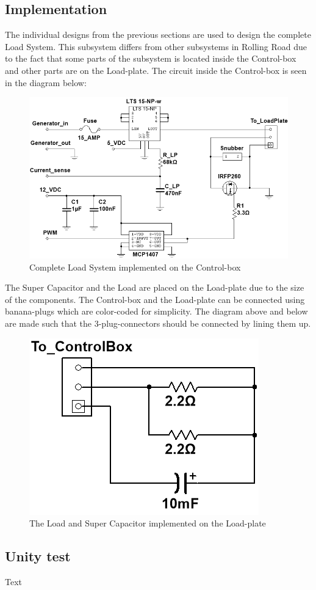 






\subsection{Implementation}
The individual designs from the previous sections are used to design the complete Load System. This subsystem differs from other subsystems in Rolling Road due to the fact that some parts of the subsystem is located inside the Control-box and other parts are on the Load-plate. The circuit inside the Control-box is seen in the diagram below:

\begin{figure}[H]
	\centering
	\includegraphics[width=1\linewidth]{Hardware/LoadSystem/LoadSystem}
	\caption{Complete Load System implemented on the Control-box}
	\label{fig:LoadSystemCircuit}
\end{figure}

The Super Capacitor and the Load are placed on the Load-plate due to the size of the components. The Control-box and the Load-plate can be connected using banana-plugs which are color-coded for simplicity. The diagram above and below are made such that the 3-plug-connectors should be connected by lining them up.

\begin{figure}[H]
	\centering
	\includegraphics[width=0.35\linewidth]{Hardware/LoadSystem/LoadPlate}
	\caption{The Load and Super Capacitor implemented on the Load-plate}
	\label{fig:LoadPlateCircuit}
\end{figure}

\subsection{Unity test}
Text